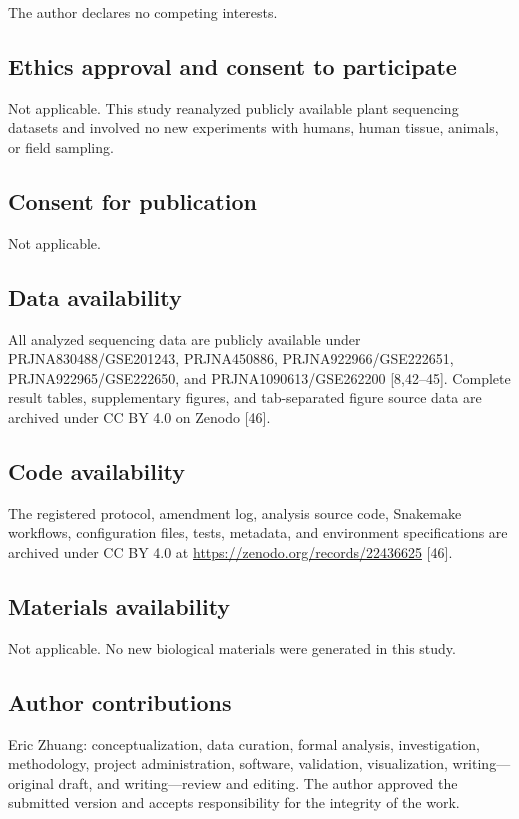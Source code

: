 \documentclass[referee,pdflatex,sn-basic,Numbered]{sn-jnl}
\begin{document}
The author declares no competing interests.

\subsection*{Ethics approval and consent to participate}

Not applicable. This study reanalyzed publicly available plant sequencing datasets and involved no new experiments with humans, human tissue, animals, or field sampling.

\subsection*{Consent for publication}

Not applicable.

\subsection*{Data availability}

All analyzed sequencing data are publicly available under PRJNA830488/GSE201243, PRJNA450886, PRJNA922966/GSE222651, PRJNA922965/GSE222650, and PRJNA1090613/GSE262200 [8,42--45]. Complete result tables, supplementary figures, and tab-separated figure source data are archived under CC BY 4.0 on Zenodo [46].

\subsection*{Code availability}

The registered protocol, amendment log, analysis source code, Snakemake workflows, configuration files, tests, metadata, and environment specifications are archived under CC BY 4.0 at \url{https://zenodo.org/records/22436625} [46].

\subsection*{Materials availability}

Not applicable. No new biological materials were generated in this study.

\subsection*{Author contributions}

Eric Zhuang: conceptualization, data curation, formal analysis, investigation, methodology, project administration, software, validation, visualization, writing---original draft, and writing---review and editing. The author approved the submitted version and accepts responsibility for the integrity of the work.
\end{document}
